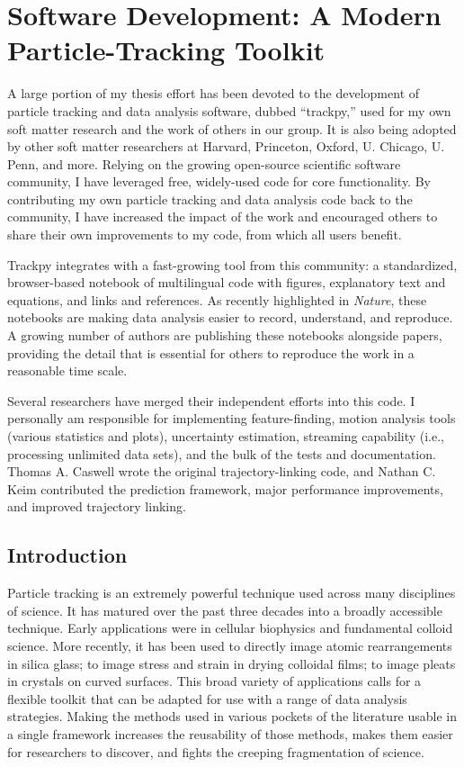 \chapter{\label{chap:trackpy}Software Development: A Modern Particle-Tracking Toolkit}

A large portion of my thesis effort has been devoted to the development of particle tracking and data analysis software, dubbed ``trackpy,'' used for my own soft matter research and the work of others in our group. It is also being adopted by other soft matter researchers at Harvard, Princeton, Oxford, U. Chicago, U. Penn, and more. Relying on the growing open-source scientific software community, I have leveraged free, widely-used code for core functionality. By contributing my own particle tracking and data analysis code back to the community, I have increased the impact of the work and encouraged others to share their own improvements to my code, from which all users benefit.

Trackpy integrates with a fast-growing tool from this community: a standardized, browser-based notebook of multilingual code with figures, explanatory text and equations, and links and references. As recently highlighted in \emph{Nature}\cite{Shen2014}, these notebooks are making data analysis easier to record, understand, and reproduce. A growing number of authors are publishing these notebooks alongside papers, providing the detail that is essential for others to reproduce the work in a reasonable time scale.

Several researchers have merged their independent efforts into this code. I personally am responsible for implementing feature-finding, motion analysis tools (various statistics and plots), uncertainty estimation, streaming capability (i.e., processing unlimited data sets), and the bulk of the tests and documentation. Thomas A. Caswell wrote the original trajectory-linking code, and Nathan C. Keim contributed the prediction framework, major performance improvements, and improved trajectory linking.

\section{Introduction}

Particle tracking is an extremely powerful technique used across many disciplines of science. It has matured over the past three decades into a broadly accessible technique. Early applications were in cellular biophysics\cite{Schnapp1988,Ghosh1994} and fundamental colloid science\cite{Crocker1996}. More recently, it has been used to directly image atomic rearrangements in silica glass\cite{Huang2013a}; to image stress and strain in drying colloidal films\cite{Xu2013a}; to image pleats in crystals on curved surfaces\cite{Irvine2010}. This broad variety of applications calls for a flexible toolkit that can be adapted for use with a range of data analysis strategies. Making the methods used in various pockets of the literature usable in a single framework increases the reusability of those methods, makes them easier for researchers to discover, and fights the creeping fragmentation of science.

